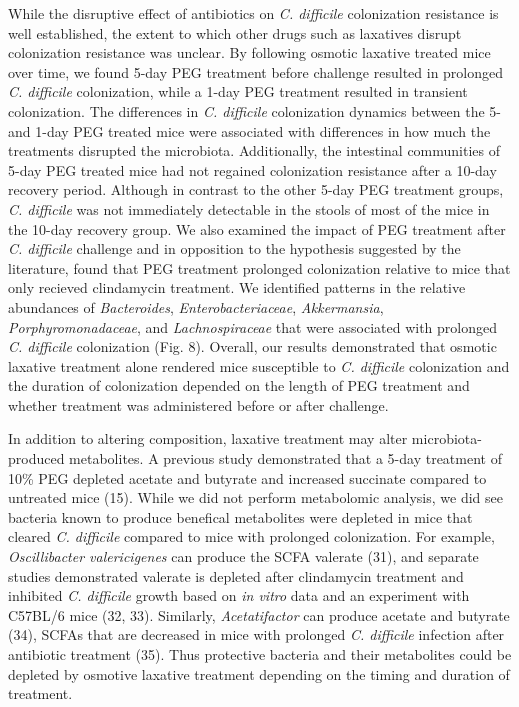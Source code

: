 \documentclass[
  11pt,
]{article}
\begin{document}
While the disruptive effect of antibiotics on \emph{C. difficile}
colonization resistance is well established, the extent to which other
drugs such as laxatives disrupt colonization resistance was unclear. By
following osmotic laxative treated mice over time, we found 5-day PEG
treatment before challenge resulted in prolonged \emph{C. difficile}
colonization, while a 1-day PEG treatment resulted in transient
colonization. The differences in \emph{C. difficile} colonization
dynamics between the 5- and 1-day PEG treated mice were associated with
differences in how much the treatments disrupted the microbiota.
Additionally, the intestinal communities of 5-day PEG treated mice had
not regained colonization resistance after a 10-day recovery period.
Although in contrast to the other 5-day PEG treatment groups, \emph{C.
difficile} was not immediately detectable in the stools of most of the
mice in the 10-day recovery group. We also examined the impact of PEG
treatment after \emph{C. difficile} challenge and in opposition to the
hypothesis suggested by the literature, found that PEG treatment
prolonged colonization relative to mice that only recieved clindamycin
treatment. We identified patterns in the relative abundances of
\emph{Bacteroides}, \emph{Enterobacteriaceae}, \emph{Akkermansia},
\emph{Porphyromonadaceae}, and \emph{Lachnospiraceae} that were
associated with prolonged \emph{C. difficile} colonization (Fig. 8).
Overall, our results demonstrated that osmotic laxative treatment alone
rendered mice susceptible to \emph{C. difficile} colonization and the
duration of colonization depended on the length of PEG treatment and
whether treatment was administered before or after challenge.

In addition to altering composition, laxative treatment may alter
microbiota-produced metabolites. A previous study demonstrated that a
5-day treatment of 10\% PEG depleted acetate and butyrate and increased
succinate compared to untreated mice (15). While we did not perform
metabolomic analysis, we did see bacteria known to produce benefical
metabolites were depleted in mice that cleared \emph{C. difficile}
compared to mice with prolonged colonization. For example,
\emph{Oscillibacter valericigenes} can produce the SCFA valerate (31),
and separate studies demonstrated valerate is depleted after clindamycin
treatment and inhibited \emph{C. difficile} growth based on \emph{in
vitro} data and an experiment with C57BL/6 mice (32, 33). Similarly,
\emph{Acetatifactor} can produce acetate and butyrate (34), SCFAs that
are decreased in mice with prolonged \emph{C. difficile} infection after
antibiotic treatment (35). Thus protective bacteria and their
metabolites could be depleted by osmotive laxative treatment depending
on the timing and duration of treatment.
\end{document}
